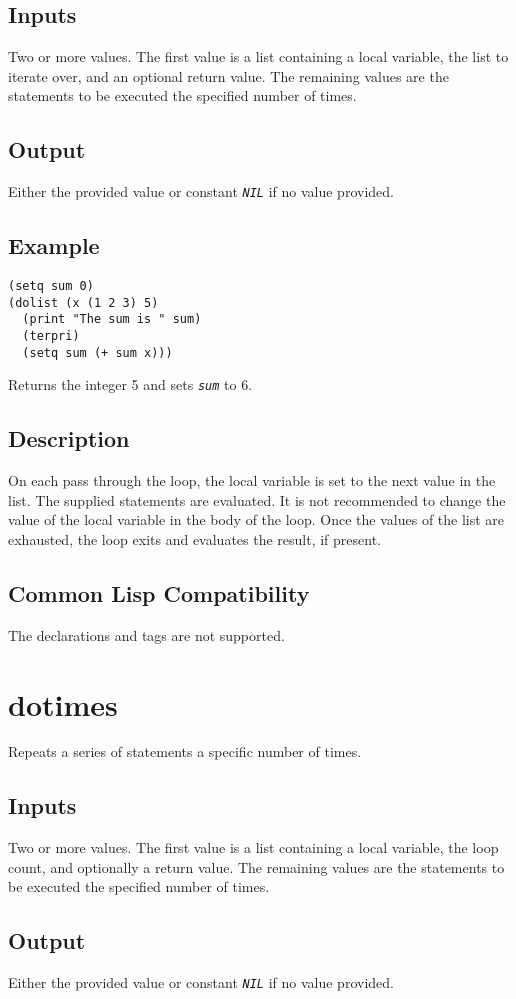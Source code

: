 \documentclass[10pt, openany]{book}
\newcommand{\constant}[1]{\emph{\texttt{#1}}}
\begin{document}
\subsection{Inputs}
Two or more values.  The first value is a list containing a local variable, the list to iterate over, and an optional return value.   The remaining values are the statements to be executed the specified number of times.
\subsection{Output}
Either the provided value or constant \constant{NIL} if no value provided.
\subsection{Example}
\begin{lstlisting}
(setq sum 0)
(dolist (x (1 2 3) 5)
  (print "The sum is " sum)
  (terpri)
  (setq sum (+ sum x)))
\end{lstlisting}
Returns the integer 5 and sets \constant{sum} to 6.
\subsection{Description}
On each pass through the loop, the local variable is set to the next value in the list.  The supplied statements are evaluated.  It is not recommended to change the value of the local variable in the body of the loop.  Once the values of the list are exhausted, the loop exits and evaluates the result, if present.
\subsection{Common Lisp Compatibility}
The declarations and tags are not supported.

\section{dotimes}
Repeats a series of statements a specific number of times.
\subsection{Inputs}
Two or more values.  The first value is a list containing a local variable, the loop count, and optionally a return value.  The remaining values are the statements to be executed the specified number of times.
\subsection{Output}
Either the provided value or constant \constant{NIL} if no value provided.
\end{document}
